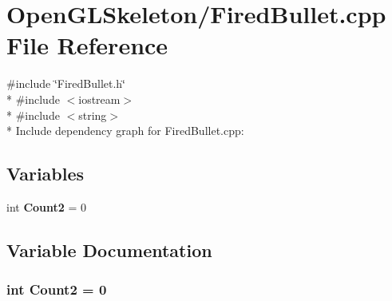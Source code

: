 \section{Open\+G\+L\+Skeleton/\+Fired\+Bullet.cpp File Reference}
\label{_fired_bullet_8cpp}
{\ttfamily \#include \char`\"{}Fired\+Bullet.\+h\char`\"{}}\\*
{\ttfamily \#include $<$iostream$>$}\\*
{\ttfamily \#include $<$string$>$}\\*
Include dependency graph for Fired\+Bullet.\+cpp\+:
\subsection*{Variables}
\begin{DoxyCompactItemize}
\item 
int {\bf Count2} = 0
\end{DoxyCompactItemize}


\subsection{Variable Documentation}
\subsubsection[{Count2}]{\setlength{\rightskip}{0pt plus 5cm}int Count2 = 0}\label{_fired_bullet_8cpp_a1018fd1d06f9728b1adae77ad969ad19}
